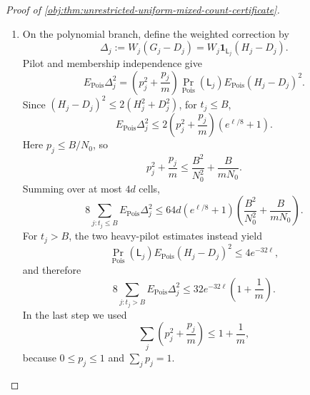 \begin{proof}[Proof of \cref{obj:thm:unrestricted-uniform-mixed-count-certificate}]
\begin{enumerate}
Expanding the variance of the independent product \(W_jD_j\) gives
\[
\operatorname{Var}_{\mathrm{Pois}}(W_jD_j)
=p_j^2\operatorname{Var}_{\mathrm{Pois}}(D_j)
+\frac{p_j}{m}E_{\mathrm{Pois}}D_j^2.
\]
Using \(D_j^2\le1\) and \(N_0p_j\le t_j\),
\[
\frac{p_j^2}{1+t_j}\le\frac{p_j}{N_0},
\]
including \(p_j=0\). Summing over cells proves
\[
\sum_j\operatorname{Var}_{\mathrm{Pois}}(W_jD_j)
\le\frac4{N_0}+\frac1m.
\]

\item On the polynomial branch, define the weighted correction by
\[
\Delta_j:=W_j(G_j-D_j)
=W_j\mathbf1_{\mathsf L_j}(H_j-D_j).
\]
Pilot and membership independence give
\[
E_{\mathrm{Pois}}\Delta_j^2
=
\left(p_j^2+\frac{p_j}{m}\right)
\Pr_{\mathrm{Pois}}(\mathsf L_j)
E_{\mathrm{Pois}}(H_j-D_j)^2.
\]
Since \((H_j-D_j)^2\le2(H_j^2+D_j^2)\), for \(t_j\le B\),
\[
E_{\mathrm{Pois}}\Delta_j^2
\le2\left(p_j^2+\frac{p_j}{m}\right)(e^{\ell/8}+1).
\]
Here \(p_j\le B/N_0\), so
\[
p_j^2+\frac{p_j}{m}
\le\frac{B^2}{N_0^2}+\frac{B}{mN_0}.
\]
Summing over at most \(4d\) cells,
\[
8\sum_{j:t_j\le B}E_{\mathrm{Pois}}\Delta_j^2
\le
64d(e^{\ell/8}+1)
\left(\frac{B^2}{N_0^2}+\frac{B}{mN_0}\right).
\]
For \(t_j>B\), the two heavy-pilot estimates instead yield
\[
\Pr_{\mathrm{Pois}}(\mathsf L_j)
E_{\mathrm{Pois}}(H_j-D_j)^2
\le4e^{-32\ell},
\]
and therefore
\[
8\sum_{j:t_j>B}E_{\mathrm{Pois}}\Delta_j^2
\le32e^{-32\ell}\left(1+\frac1m\right).
\]
In the last step we used
\[
\sum_j\left(p_j^2+\frac{p_j}{m}\right)
\le1+\frac1m,
\]
because \(0\le p_j\le1\) and \(\sum_jp_j=1\).


\end{enumerate}
\end{proof}
